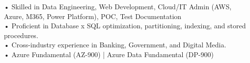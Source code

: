 • Skilled in Data Engineering, Web Development, Cloud/IT Admin (AWS, Azure, M365, Power Platform), POC, Test Documentation\\
• Proficient in Database x SQL optimization, partitioning, indexing, and stored procedures.\\
• Cross-industry experience in Banking, Government, and Digital Media.\\
• Azure Fundamental (AZ-900) | Azure Data Fundamental (DP-900)
